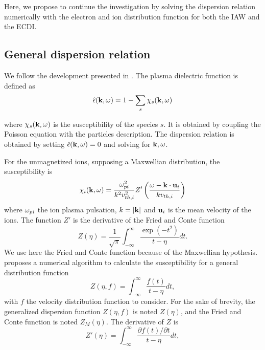   Here, we propose to continue the investigation by solving the dispersion relation numerically with the electron and ion distribution function for both the \ac{IAW} and the \ac{ECDI}.
  
  
  \subsection{General dispersion relation}
    \label{sec-geneDR}
    
    We follow the development presented in \citet{ducrocq2006,cavalier2013,lafleur2016}.
    The plasma dielectric function is defined as
    \begin{equation} \label{eq-de}
      \hat\epsilon({\mathbf k},\omega) = 1 - \sum_s \chi_s({\mathbf k},\omega)
    \end{equation}
    
    where $\chi_s({\mathbf k}, \omega)$ is the susceptibility of the species $s$.
    It is obtained by coupling the Poisson equation with the particles description.
    The dispersion relation is obtained by setting $  \hat\epsilon({\mathbf k},\omega) =0$ and solving for ${\mathbf k},\omega$.
    
    
    For the unmagnetized ions, supposing a Maxwellian distribution, the susceptibility is
    \begin{equation} \label{eq-susceptibility}
      \chi_i({\mathbf k},\omega) = \frac{\omega_{pi}^2}{k^2 v^2_{th, i}} Z'\left( \frac{\omega - {\mathbf k} \cdot {\mathbf u_{i}}}{k v_{th, i}}  \right)
    \end{equation}
    where $\omega_{pi}$ the ion plasma pulsation, $k=\lvert{\mathbf k}\rvert$ and ${\mathbf u_i}$ is the mean velocity of the ions.
    The function $Z'$ is the derivative of the Fried and Conte function \citep{fried1961}
    \begin{equation} \label{eq-friedandConte}
      Z(\eta) = \frac{1}{\sqrt{\pi}} \int_{-\infty}^{\infty} \frac{\exp{(-t^2)}}{t - \eta} dt.
    \end{equation}
    We use here the Fried and Conte function because of the Maxwellian hypothesis.
    \citet{xie2013} proposes a numerical algorithm to calculate the susceptibility for a general distribution function
    \begin{equation} \label{eq-general}
      Z(\eta, f) = \int_{-\infty}^{\infty} \frac{f(t)}{t - \eta} dt,
    \end{equation}
    with $f$ the velocity distribution function to consider.
    For the sake of brevity, the generalized dispersion function $Z(\eta,f)$ is noted $Z(\eta)$, and the Fried and Conte function is noted $Z_M(\eta)$.
    The derivative of $Z$ is
    \begin{equation} \label{eq-derivatives}
      Z'(\eta) = \int_{-\infty}^{\infty} \frac{\partial f(t) / \partial t}{t - \eta} dt,
    \end{equation}
    
